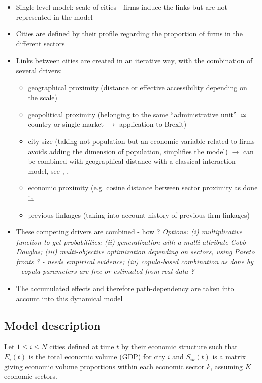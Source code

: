 \documentclass{article}
\begin{document}
\begin{itemize}
    \item Single level model: scale of cities - firms induce the links but are not represented in the model
    \item Cities are defined by their profile regarding the proportion of firms in the different sectors
    \item Links between cities are created in an iterative way, with the combination of several drivers:
    \begin{itemize}
        \item geographical proximity (distance or effective accessibility depending on the scale)
        \item geopolitical proximity (belonging to the same ``administrative unit'' $\simeq$ country or single market $\rightarrow$ application to Brexit)
        \item city size (taking not population but an economic variable related to firms avoids adding the dimension of population, simplifies the model) $\rightarrow$ can be combined with geographical distance with a classical interaction model, see \cite{cottineau2015growing}, \cite{raimbault2018indirect}, \cite{favaro2011gibrat}
        \item economic proximity (e.g. cosine distance between sector proximity as done in \cite{2019arXiv190505106C}
        \item previous linkages (taking into account history of previous firm linkages)
    \end{itemize}
    \item These competing drivers are combined - how ? \textit{Options: (i) multiplicative function to get probabilities; (ii) generalization with a multi-attribute Cobb-Douglas; (iii) multi-objective optimization depending on sectors, using Pareto fronts ? - needs empirical evidence; (iv) copula-based combination as done by \cite{2019arXiv190505106C} - copula parameters are free or estimated from real data ?}
    \item The accumulated effects and therefore path-dependency are taken into account into this dynamical model
\end{itemize}


\subsection{Model description}

Let $1 \leq i \leq N$ cities defined at time $t$ by their economic structure such that $E_i(t)$ is the total economic volume (GDP) for city $i$ and $S_{ik}(t)$ is a matrix giving economic volume proportions within each economic sector $k$, assuming $K$ economic sectors.
\end{document}

